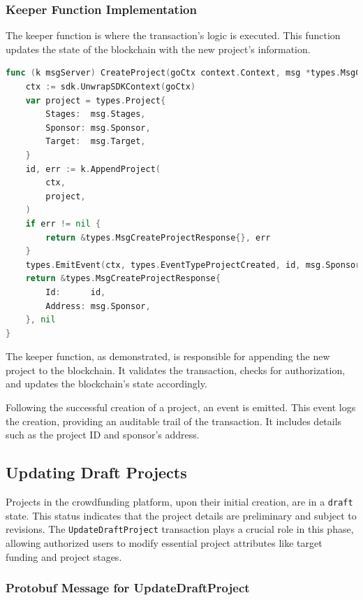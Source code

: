 \subsubsection{Keeper Function Implementation}

The keeper function is where the transaction's logic is executed. This function updates the state of the blockchain with the new project's information.

\begin{lstlisting}[language=go, caption=Keeper implementation for CreateProject, label={lst:keeper_create_project}]
func (k msgServer) CreateProject(goCtx context.Context, msg *types.MsgCreateProject) (*types.MsgCreateProjectResponse, error) {
	ctx := sdk.UnwrapSDKContext(goCtx)
	var project = types.Project{
		Stages:  msg.Stages,
		Sponsor: msg.Sponsor,
		Target:  msg.Target,
	}
	id, err := k.AppendProject(
		ctx,
		project,
	)
	if err != nil {
		return &types.MsgCreateProjectResponse{}, err
	}
	types.EmitEvent(ctx, types.EventTypeProjectCreated, id, msg.Sponsor)
	return &types.MsgCreateProjectResponse{
		Id:      id,
		Address: msg.Sponsor,
	}, nil
}
\end{lstlisting}

The keeper function, as demonstrated, is responsible for appending the new project to the blockchain. It validates the transaction, checks for authorization, and updates the blockchain's state accordingly.

Following the successful creation of a project, an event is emitted. This event logs the creation, providing an auditable trail of the transaction. It includes details such as the project ID and sponsor's address.


\subsection{Updating Draft Projects}

Projects in the crowdfunding platform, upon their initial creation, are in a \texttt{draft} state. This status indicates that the project details are preliminary and subject to revisions. The \texttt{UpdateDraftProject} transaction plays a crucial role in this phase, allowing authorized users to modify essential project attributes like target funding and project stages.

\subsubsection{Protobuf Message for UpdateDraftProject}

